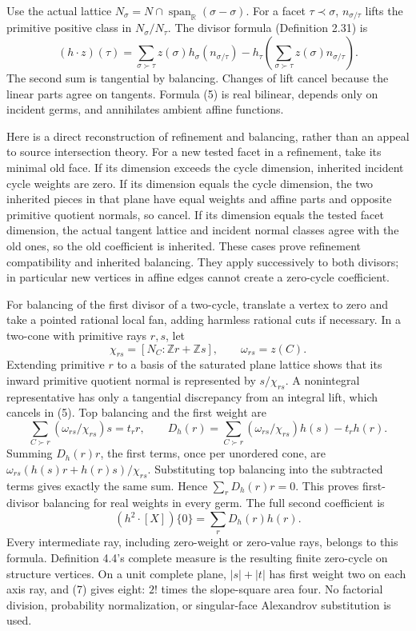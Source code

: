 \documentclass[
  11pt,
]{article}
\begin{document}
Use the actual lattice
\(N_\sigma=N\cap\operatorname{span}_{\mathbb{R}}(\sigma-\sigma)\). For a
facet \(\tau\prec\sigma\), \(n_{\sigma/\tau}\) lifts the primitive
positive class in \(N_\sigma/N_\tau\). The divisor formula (Definition
2.31) is \[
 (h\cdot z)(\tau)=\sum_{\sigma\succ\tau}z(\sigma)h_\sigma(n_{\sigma/\tau})
       -h_\tau\left(\sum_{\sigma\succ\tau}z(\sigma)n_{\sigma/\tau}\right).
                                                               \tag{5}
\] The second sum is tangential by balancing. Changes of lift cancel
because the linear parts agree on tangents. Formula (5) is real
bilinear, depends only on incident germs, and annihilates ambient affine
functions.

Here is a direct reconstruction of refinement and balancing, rather than
an appeal to source intersection theory. For a new tested facet in a
refinement, take its minimal old face. If its dimension exceeds the
cycle dimension, inherited incident cycle weights are zero. If its
dimension equals the cycle dimension, the two inherited pieces in that
plane have equal weights and affine parts and opposite primitive
quotient normals, so cancel. If its dimension equals the tested facet
dimension, the actual tangent lattice and incident normal classes agree
with the old ones, so the old coefficient is inherited. These cases
prove refinement compatibility and inherited balancing. They apply
successively to both divisors; in particular new vertices in affine
edges cannot create a zero-cycle coefficient.

For balancing of the first divisor of a two-cycle, translate a vertex to
zero and take a pointed rational local fan, adding harmless rational
cuts if necessary. In a two-cone with primitive rays \(r,s\), let \[
 \chi_{rs}=[N_C:\mathbb Zr+\mathbb Zs],\qquad \omega_{rs}=z(C).
\] Extending primitive \(r\) to a basis of the saturated plane lattice
shows that its inward primitive quotient normal is represented by
\(s/\chi_{rs}\). A nonintegral representative has only a tangential
discrepancy from an integral lift, which cancels in (5). Top balancing
and the first weight are \[
 \sum_{C\succ r}(\omega_{rs}/\chi_{rs})s=t_r r,
 \qquad D_h(r)=\sum_{C\succ r}(\omega_{rs}/\chi_{rs})h(s)-t_rh(r). \tag{6}
\] Summing \(D_h(r)r\), the first terms, once per unordered cone, are
\(\omega_{rs}(h(s)r+h(r)s)/\chi_{rs}\). Substituting top balancing into
the subtracted terms gives exactly the same sum. Hence
\(\sum_rD_h(r)r=0\). This proves first-divisor balancing for real
weights in every germ. The full second coefficient is \[
                       (h^2\cdot[X])\{0\}=\sum_rD_h(r)h(r).     \tag{7}
\] Every intermediate ray, including zero-weight or zero-value rays,
belongs to this formula. Definition 4.4's complete measure is the
resulting finite zero-cycle on structure vertices. On a unit complete
plane, \(|s|+|t|\) has first weight two on each axis ray, and (7) gives
eight: \(2!\) times the slope-square area four. No factorial division,
probability normalization, or singular-face Alexandrov substitution is
used.
\end{document}
